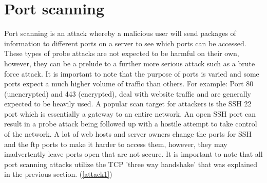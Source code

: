 \section{Port scanning}
Port scanning is an attack whereby a malicious user will send packages of information to different ports on a server to see which ports can be accessed. These types of probe attacks are not expected to be harmful on their own, however, they can be a prelude to a further more serious attack such as a brute force attack. It is important to note that the purpose of ports is varied and some ports expect a much higher volume of traffic than others. For example: Port 80 (unencrypted) and 443 (encrypted), deal with website traffic and are generally expected to be heavily used. A popular scan target for attackers is the SSH 22 port which is essentially a gateway to an entire network. An open SSH port can result in a probe attack being followed up with a hostile attempt to take control of the network. A lot of web hosts and server owners change the ports for SSH and the ftp ports to make it harder to access them, however, they may inadvertently leave ports open that are not secure. It is important to note that all port scanning attacks utilize the TCP 'three way handshake' that was explained in the previous section. (\ref{attack1})
